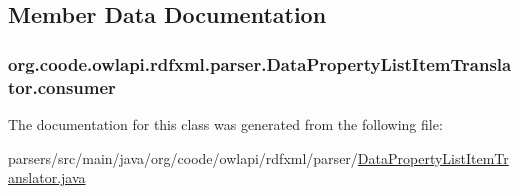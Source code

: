 \subsection{Member Data Documentation}
\hypertarget{classorg_1_1coode_1_1owlapi_1_1rdfxml_1_1parser_1_1_data_property_list_item_translator_a04fba3154929d2aa5975d33e97cbfdb3}{
\subsubsection[{consumer}]{ org.\-coode.\-owlapi.\-rdfxml.\-parser.\-Data\-Property\-List\-Item\-Translator.\-consumer\hspace{0.3cm}{\ttfamily [private]}}}\label{classorg_1_1coode_1_1owlapi_1_1rdfxml_1_1parser_1_1_data_property_list_item_translator_a04fba3154929d2aa5975d33e97cbfdb3}


The documentation for this class was generated from the following file\-:\begin{DoxyCompactItemize}
\item 
parsers/src/main/java/org/coode/owlapi/rdfxml/parser/\hyperlink{_data_property_list_item_translator_8java}{Data\-Property\-List\-Item\-Translator.\-java}\end{DoxyCompactItemize}
